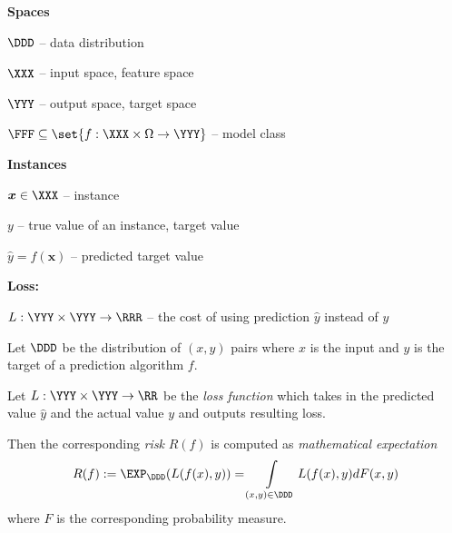 \documentclass[landscape,footrule]{foils}
\renewcommand{\vec}[1]{\boldsymbol{#1}}
\begin{document}

\textbf{Spaces}
\begin{triangles}
\item $\DDD$ -- data distribution
\item $\XXX$ -- input space, feature space
\item $\YYY$ -- output space, target space
\item $\FFF\subseteq\set{f:\XXX\times\Omega\to\YYY}$ -- model class\vspace*{0.5cm}
\end{triangles}

\textbf{Instances}
\begin{triangles}
\item $\vec{x}\in\XXX$ -- instance
\item $y$ -- true value of an instance, target value
\item $\hat{y}=f(\vec{x})$ -- predicted target value\vspace*{0.5cm}
\end{triangles}

\textbf{Loss:}
\begin{triangles}
\item $L:\YYY\times\YYY\to\RRR$ --  the cost of using prediction $\hat{y}$ instead of $y$
\end{triangles}
 

 

Let $\DDD$ be the distribution of $(x,y)$ pairs where $x$ is the input and $y$ is the target of a prediction algorithm $f$. 
\bigskip

Let $L:\YYY\times\YYY\to\RR$ be the \emph{loss function} which takes in the predicted value $\hat{y}$ and the actual value $y$ and outputs resulting loss.
\bigskip

Then the corresponding \emph{risk} $R(f)$ is computed as \emph{mathematical expectation}
\begin{align*}
 R(f):=\EXP_\DDD(L(f(x), y))=\int\limits_{(x,y)\in\DDD} L(f(x), y) dF(x,y)
\end{align*}   
where $F$ is the corresponding probability measure.

\end{document}
